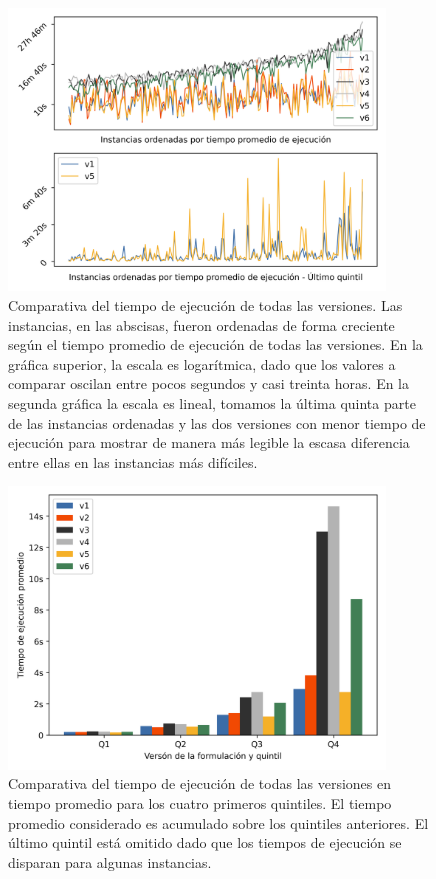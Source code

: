 \begin{figure}[h!]
  \centering
  \includegraphics[width=10cm]{../resources/run_time_comparsion.png}
  \caption{Comparativa del tiempo de ejecución de todas las versiones. Las instancias, en las abscisas, fueron ordenadas de forma creciente según el tiempo promedio de ejecución de todas las versiones. En la gráfica superior, la escala es logarítmica, dado que los valores a comparar oscilan entre pocos segundos y casi treinta horas. En la segunda gráfica la escala es lineal, tomamos la última quinta parte de las instancias ordenadas y las dos versiones con menor tiempo de ejecución para mostrar de manera más legible la escasa diferencia entre ellas en las instancias más difíciles.}
  \label{fig:runtimecomparison}
\end{figure}

\begin{figure}[h!]
  \centering
  \includegraphics[width=10cm]{../resources/run_time_comparsion_by_quintile.png}
    \caption{Comparativa del tiempo de ejecución de todas las versiones en tiempo promedio para los cuatro primeros quintiles. El tiempo promedio considerado es acumulado sobre los quintiles anteriores. El último quintil está omitido dado que los tiempos de ejecución se disparan para algunas instancias.}
  \label{fig:firstfourquintiles}
\end{figure}

